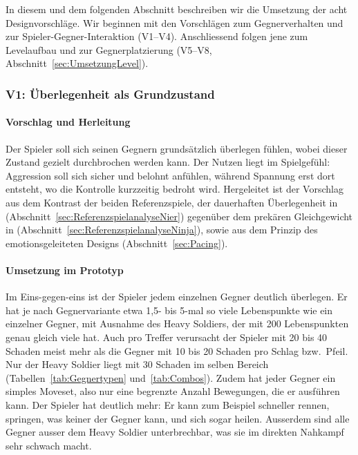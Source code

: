 \documentclass[../Main.tex]{subfiles}
\begin{document}
In diesem und dem folgenden Abschnitt beschreiben wir die Umsetzung der acht Designvorschläge. Wir beginnen mit den Vorschlägen zum Gegnerverhalten und zur Spieler-Gegner-Interaktion (V1--V4). Anschliessend folgen jene zum Levelaufbau und zur Gegnerplatzierung (V5--V8, Abschnitt~\ref{sec:UmsetzungLevel}).

\subsubsection{V1: Überlegenheit als Grundzustand} \label{sec:V1}

\paragraph{Vorschlag und Herleitung}
Der Spieler soll sich seinen Gegnern grundsätzlich überlegen fühlen, wobei dieser Zustand gezielt durchbrochen werden kann. Der Nutzen liegt im Spielgefühl: Aggression soll sich sicher und belohnt anfühlen, während Spannung erst dort entsteht, wo die Kontrolle kurzzeitig bedroht wird. Hergeleitet ist der Vorschlag aus dem Kontrast der beiden Referenzspiele, der dauerhaften Überlegenheit in  (Abschnitt~\ref{sec:ReferenzspielanalyseNier}) gegenüber dem prekären Gleichgewicht in  (Abschnitt~\ref{sec:ReferenzspielanalyseNinja}), sowie aus dem Prinzip des emotionsgeleiteten Designs (Abschnitt~\ref{sec:Pacing}).

\paragraph{Umsetzung im Prototyp}
Im Eins-gegen-eins ist der Spieler jedem einzelnen Gegner deutlich überlegen. Er hat je nach Gegnervariante etwa 1,5- bis 5-mal so viele Lebenspunkte wie ein einzelner Gegner, mit Ausnahme des Heavy Soldiers, der mit 200 Lebenspunkten genau gleich viele hat. Auch pro Treffer verursacht der Spieler mit 20 bis 40 Schaden meist mehr als die Gegner mit 10 bis 20 Schaden pro Schlag bzw.\ Pfeil. Nur der Heavy Soldier liegt mit 30 Schaden im selben Bereich (Tabellen~\ref{tab:Gegnertypen} und~\ref{tab:Combos}). Zudem hat jeder Gegner ein simples Moveset, also nur eine begrenzte Anzahl Bewegungen, die er ausführen kann. Der Spieler hat deutlich mehr: Er kann zum Beispiel schneller rennen, springen, was keiner der Gegner kann, und sich sogar heilen. Ausserdem sind alle Gegner ausser dem Heavy Soldier unterbrechbar, was sie im direkten Nahkampf sehr schwach macht.
\end{document}
